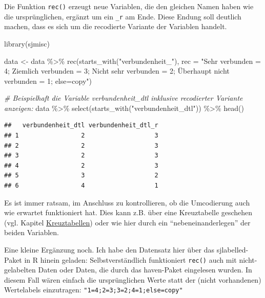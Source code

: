 \documentclass[
]{book}
\newenvironment{Shaded}{\begin{snugshade}}{\end{snugshade}}
\newcommand{\AttributeTok}[1]{\textcolor[rgb]{0.77,0.63,0.00}{#1}}
\newcommand{\CommentTok}[1]{\textcolor[rgb]{0.56,0.35,0.01}{\textit{#1}}}
\newcommand{\FunctionTok}[1]{\textcolor[rgb]{0.00,0.00,0.00}{#1}}
\newcommand{\NormalTok}[1]{#1}
\newcommand{\OtherTok}[1]{\textcolor[rgb]{0.56,0.35,0.01}{#1}}
\newcommand{\SpecialCharTok}[1]{\textcolor[rgb]{0.00,0.00,0.00}{#1}}
\newcommand{\StringTok}[1]{\textcolor[rgb]{0.31,0.60,0.02}{#1}}
\begin{document}
Die Funktion \texttt{rec()} erzeugt neue Variablen, die den gleichen Namen haben wie die ursprünglichen, ergänzt um ein \texttt{\_r} am Ende. Diese Endung soll deutlich machen, dass es sich um die recodierte Variante der Variablen handelt.

\begin{Shaded}
\begin{Highlighting}[]
\FunctionTok{library}\NormalTok{(sjmisc)}

\NormalTok{data }\OtherTok{\textless{}{-}}\NormalTok{ data }\SpecialCharTok{\%\textgreater{}\%} 
  \FunctionTok{rec}\NormalTok{(}\FunctionTok{starts\_with}\NormalTok{(}\StringTok{"verbundenheit\_"}\NormalTok{), }\AttributeTok{rec =} \StringTok{"Sehr verbunden = 4;}
\StringTok{                                             Ziemlich verbunden = 3;}
\StringTok{                                             Nicht sehr verbunden = 2; }
\StringTok{                                             Überhaupt nicht verbunden = 1;}
\StringTok{                                             else=copy"}\NormalTok{) }

\CommentTok{\# Beispielhaft die Variable verbundenheit\_dtl inklusive recodierter Variante anzeigen:}
\NormalTok{data }\SpecialCharTok{\%\textgreater{}\%} 
  \FunctionTok{select}\NormalTok{(}\FunctionTok{starts\_with}\NormalTok{(}\StringTok{"verbundenheit\_dtl"}\NormalTok{)) }\SpecialCharTok{\%\textgreater{}\%} 
  \FunctionTok{head}\NormalTok{()}
\end{Highlighting}
\end{Shaded}

\begin{verbatim}
##   verbundenheit_dtl verbundenheit_dtl_r
## 1                 2                   3
## 2                 2                   3
## 3                 2                   3
## 4                 2                   3
## 5                 3                   2
## 6                 4                   1
\end{verbatim}

Es ist immer ratsam, im Anschluss zu kontrollieren, ob die Umcodierung auch wie erwartet funktioniert hat. Dies kann z.B. über eine Kreuztabelle geschehen (vgl. Kapitel \protect\hyperlink{kreuztabellen}{Kreuztabellen}) oder wie hier durch ein ``nebeneinanderlegen'' der beiden Variablen.

Eine kleine Ergänzung noch. Ich habe den Datensatz hier über das sjlabelled-Paket in R hinein geladen: Selbstverständlich funktioniert \texttt{rec()} auch mit nicht-gelabelten Daten oder Daten, die durch das haven-Paket eingelesen wurden. In diesem Fall wären einfach die ursprünglichen Werte statt der (nicht vorhandenen) Wertelabels einzutragen: \texttt{"1=4;2=3;3=2;4=1;else=copy"}
\end{document}
